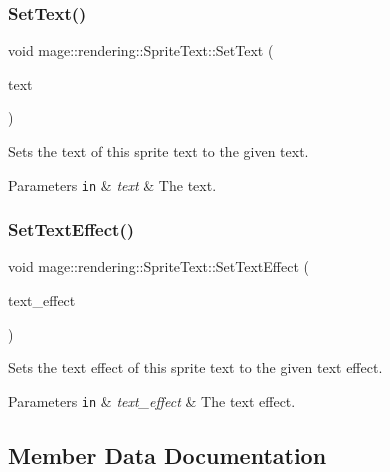 \subsubsection{\texorpdfstring{Set\+Text()}{SetText()}}
{\footnotesize\ttfamily void mage\+::rendering\+::\+Sprite\+Text\+::\+Set\+Text (\begin{DoxyParamCaption}\item[{\hyperlink{classmage_1_1rendering_1_1_color_string}{Color\+String}}]{text }\end{DoxyParamCaption})}

Sets the text of this sprite text to the given text.


\begin{DoxyParams}[1]{Parameters}
\mbox{\tt in}  & {\em text} & The text. \\
\hline
\end{DoxyParams}
\hypertarget{classmage_1_1rendering_1_1_sprite_text_a0870da91f8c11f63c09bf6de1bce4ce3}{}\label{classmage_1_1rendering_1_1_sprite_text_a0870da91f8c11f63c09bf6de1bce4ce3} 
\subsubsection{\texorpdfstring{Set\+Text\+Effect()}{SetTextEffect()}}
{\footnotesize\ttfamily void mage\+::rendering\+::\+Sprite\+Text\+::\+Set\+Text\+Effect (\begin{DoxyParamCaption}\item[{\hyperlink{classmage_1_1rendering_1_1_sprite_text_af07ecf28d2ab8997c011cab74e799ef7}{Text\+Effect}}]{text\+\_\+effect }\end{DoxyParamCaption})\hspace{0.3cm}{\ttfamily [noexcept]}}

Sets the text effect of this sprite text to the given text effect.


\begin{DoxyParams}[1]{Parameters}
\mbox{\tt in}  & {\em text\+\_\+effect} & The text effect. \\
\hline
\end{DoxyParams}


\subsection{Member Data Documentation}
\hypertarget{classmage_1_1rendering_1_1_sprite_text_ad682901cbe866d2dc316bf3238812d25}{}\label{classmage_1_1rendering_1_1_sprite_text_ad682901cbe866d2dc316bf3238812d25} 
